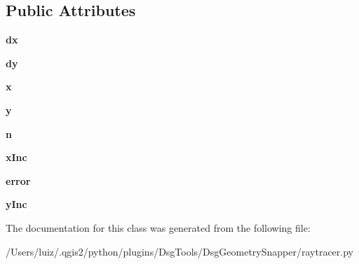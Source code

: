 \subsection*{Public Attributes}
\begin{DoxyCompactItemize}
\item 
\mbox{\label{class_dsg_tools_1_1_dsg_geometry_snapper_1_1raytracer_1_1_raytracer_a4871c7c217c90b4d9e0fd268350ac1a3}} 
{\bfseries dx}
\item 
\mbox{\label{class_dsg_tools_1_1_dsg_geometry_snapper_1_1raytracer_1_1_raytracer_af130235041bff5a8a0f3e2a89389958d}} 
{\bfseries dy}
\item 
\mbox{\label{class_dsg_tools_1_1_dsg_geometry_snapper_1_1raytracer_1_1_raytracer_afcb24ecdd79942705bc932dda6c6a6e2}} 
{\bfseries x}
\item 
\mbox{\label{class_dsg_tools_1_1_dsg_geometry_snapper_1_1raytracer_1_1_raytracer_af34f3e6414d039eed1548040b3a3b7a7}} 
{\bfseries y}
\item 
\mbox{\label{class_dsg_tools_1_1_dsg_geometry_snapper_1_1raytracer_1_1_raytracer_a89c7f8a3e62dcb9d4ced3b058a49e0ca}} 
{\bfseries n}
\item 
\mbox{\label{class_dsg_tools_1_1_dsg_geometry_snapper_1_1raytracer_1_1_raytracer_aa8ae6c1c70e07961c2230be992b8ed98}} 
{\bfseries x\+Inc}
\item 
\mbox{\label{class_dsg_tools_1_1_dsg_geometry_snapper_1_1raytracer_1_1_raytracer_a5e7c2a02a178cd414bf1a362e763dab8}} 
{\bfseries error}
\item 
\mbox{\label{class_dsg_tools_1_1_dsg_geometry_snapper_1_1raytracer_1_1_raytracer_a5b1fd9c05fe7a5a6b9fcb13729d3e572}} 
{\bfseries y\+Inc}
\end{DoxyCompactItemize}


The documentation for this class was generated from the following file\+:\begin{DoxyCompactItemize}
\item 
/\+Users/luiz/.\+qgis2/python/plugins/\+Dsg\+Tools/\+Dsg\+Geometry\+Snapper/raytracer.\+py\end{DoxyCompactItemize}
